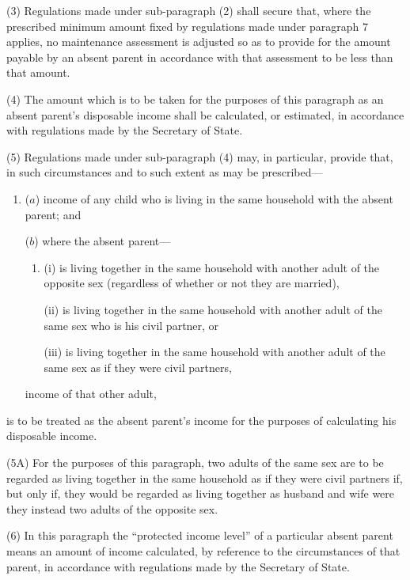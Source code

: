 \documentclass[12pt,a4paper]{article}
\begin{document}
{(3) Regulations made under sub-paragraph (2) shall secure that, where the prescribed minimum amount fixed by regulations made under paragraph 7 applies, no maintenance assessment is adjusted so as to provide for the amount payable by an absent parent in accordance with that assessment to be less than that amount.

(4) The amount which is to be taken for the purposes of this paragraph as an absent parent’s disposable income shall be calculated, or estimated, in accordance with regulations made by the Secretary of State.

(5) Regulations made under sub-paragraph (4) may, in particular, provide that, in such circumstances and to such extent as may be prescribed---
\begin{enumerate}\item[]
($a$) income of any child who is living in the same household with the absent parent; and

($b$) where the absent parent---
\begin{enumerate}\item[]
(i)
is living together in the same household with another adult of the
opposite sex (regardless of whether or not they are married),

(ii)
is living together in the same household with another adult of the same
sex who is his civil partner, or

(iii) is living together in the same household with another adult of the same
sex as if they were civil partners,
\end{enumerate}
income of that other adult,
\end{enumerate}
is to be treated as the absent parent’s income for the purposes of calculating his disposable income.

(5A) For the purposes of this paragraph, two adults of the same sex are to be regarded as living together in the same household as if they were civil partners if, but only if, they would be regarded as living together as husband and wife were they instead two adults of the opposite sex.

(6) In this paragraph the “protected income level” of a particular absent parent means an amount of income calculated, by reference to the circumstances of that parent, in accordance with regulations made by the Secretary of State.


}
\end{document}
